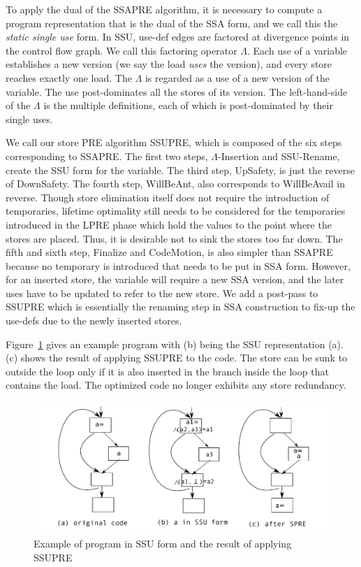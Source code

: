 To apply the dual of the SSAPRE algorithm, it is necessary to compute a program
representation that is the dual of the SSA form, and we call this the 
\emph{static single use} form.  In SSU, use-def edges are factored at
divergence points in the control flow graph.  We call this factoring operator
$\Lambda$.  Each use of a variable establishes a new version (we say the load 
\emph{uses} the version), and every store reaches exactly one load.   The
$\Lambda$ is regarded as a use of a new version of the variable.  The use
post-dominates all the stores of its version.  The left-hand-side of the
$\Lambda$ is the multiple definitions, each of which is post-dominated by their
single uses.

We call our store PRE algorithm SSUPRE, which is composed of the six steps
corresponding to SSAPRE.  The first two steps, $\Lambda$-Insertion and
SSU-Rename, create the SSU form for the variable.  The third step, UpSafety,
is just the reverse of DownSafety.  The fourth step, WillBeAnt, also corresponds
to WillBeAvail in reverse.  Though store elimination itself does not require
the introduction of temporaries, lifetime optimality still needs to be
considered for the temporaries introduced in the LPRE phase which hold the 
values to the point where the stores are placed.  Thus, it is desirable not 
to sink the stores too far down.  
The fifth and sixth step, Finalize and CodeMotion, is also simpler than 
SSAPRE because no temporary is introduced that needs to be put in SSA form.
However, for an inserted store, the variable will require a new SSA version,
and the later uses have to be updated to refer to the new store.
We add a post-pass to SSUPRE which is essentially the renaming step in SSA
construction to fix-up the use-defs due to the newly inserted stores.

Figure~\ref{fig: ssupre} gives an example program with (b) being the SSU 
representation (a).  (c) shows the result of applying SSUPRE to the code.
The store can be sunk to outside the loop only if it is also inserted in
the branch inside the loop that contains the load.  The optimized code no
longer exhibits any store redundancy.

\begin{figure}
\centering
\includegraphics[scale=0.55]{fig-ssupre.pdf}
\caption{Example of program in SSU form and the result of applying SSUPRE}
\label{fig: ssupre}
\end{figure}


